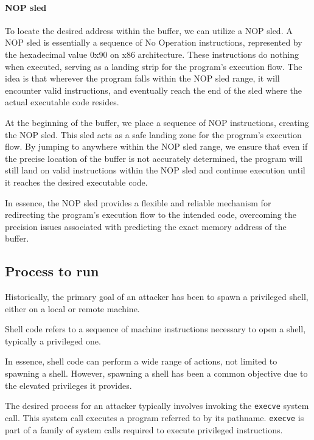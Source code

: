 \paragraph*{NOP sled}
To locate the desired address within the buffer, we can utilize a NOP sled. 
A NOP sled is essentially a sequence of No Operation instructions, represented by the hexadecimal value 0x90 on x86 architecture.
These instructions do nothing when executed, serving as a landing strip for the program's execution flow.
The idea is that wherever the program falls within the NOP sled range, it will encounter valid instructions, and eventually reach the end of the sled where the actual executable code resides.

At the beginning of the buffer, we place a sequence of NOP instructions, creating the NOP sled. 
This sled acts as a safe landing zone for the program's execution flow.
By jumping to anywhere within the NOP sled range, we ensure that even if the precise location of the buffer is not accurately determined, the program will still land on valid instructions within the NOP sled and continue execution until it reaches the desired executable code.

In essence, the NOP sled provides a flexible and reliable mechanism for redirecting the program's execution flow to the intended code, overcoming the precision issues associated with predicting the exact memory address of the buffer.

\subsection{Process to run}
Historically, the primary goal of an attacker has been to spawn a privileged shell, either on a local or remote machine.
\begin{definition}
    Shell code refers to a sequence of machine instructions necessary to open a shell, typically a privileged one.
\end{definition}
In essence, shell code can perform a wide range of actions, not limited to spawning a shell. 
However, spawning a shell has been a common objective due to the elevated privileges it provides.

The desired process for an attacker typically involves invoking the \texttt{execve} system call. 
This system call executes a program referred to by its pathname. 
\texttt{execve} is part of a family of system calls required to execute privileged instructions.

